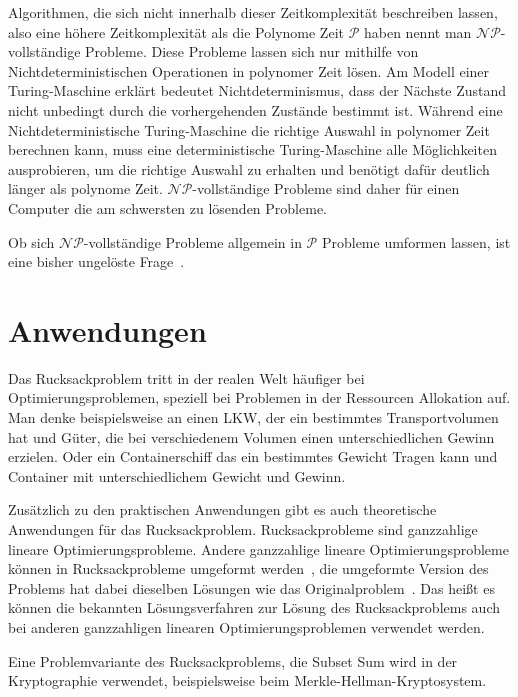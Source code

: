 \documentclass[12pt, a4paper, ngerman]{article}
\begin{document}
Algorithmen, die sich nicht innerhalb dieser Zeitkomplexität beschreiben lassen,
also eine höhere Zeitkomplexität als die Polynome Zeit \(\mathcal{P}\) haben
nennt man \(\mathcal{NP}\)-vollständige Probleme.
Diese Probleme lassen sich nur mithilfe von Nichtdeterministischen Operationen
in polynomer Zeit lösen.
Am Modell einer Turing-Maschine erklärt bedeutet Nichtdeterminismus,
dass der Nächste Zustand nicht unbedingt durch die vorhergehenden Zustände bestimmt ist.
Während eine Nichtdeterministische Turing-Maschine die richtige Auswahl in polynomer Zeit berechnen kann,
muss eine deterministische Turing-Maschine alle Möglichkeiten ausprobieren, um die richtige Auswahl zu erhalten
und benötigt dafür deutlich länger als polynome Zeit.
\(\mathcal{NP}\)-vollständige Probleme sind daher für einen Computer
die am schwersten zu lösenden Probleme.

Ob sich \(\mathcal{NP}\)-vollständige Probleme allgemein in \(\mathcal{P}\) Probleme umformen lassen,
ist eine bisher ungelöste Frage~\cite[Kap. 15]{KombinatorischeOptimierung}.

\section{Anwendungen}

Das Rucksackproblem tritt in der realen Welt häufiger bei Optimierungsproblemen,
speziell bei Problemen in der Ressourcen Allokation auf.
Man denke beispielsweise an einen LKW, der ein bestimmtes Transportvolumen hat und Güter,
die bei verschiedenem Volumen einen unterschiedlichen Gewinn erzielen.
Oder ein Containerschiff das ein bestimmtes Gewicht Tragen kann
und Container mit unterschiedlichem Gewicht und Gewinn.

Zusätzlich zu den praktischen Anwendungen gibt es auch theoretische Anwendungen für das Rucksackproblem.
Rucksackprobleme sind ganzzahlige lineare Optimierungsprobleme.
Andere ganzzahlige lineare Optimierungsprobleme können in Rucksackprobleme umgeformt werden~\cite{mainKnapsack},
die umgeformte Version des Problems hat dabei dieselben Lösungen wie das Originalproblem~\cite{mainKnapsack}.
Das heißt es können die bekannten Lösungsverfahren zur Lösung des Rucksackproblems
auch bei anderen ganzzahligen linearen Optimierungsproblemen verwendet werden.

Eine Problemvariante des Rucksackproblems, die Subset Sum wird in der Kryptographie verwendet,
beispielsweise beim Merkle-Hellman-Kryptosystem.
\end{document}
